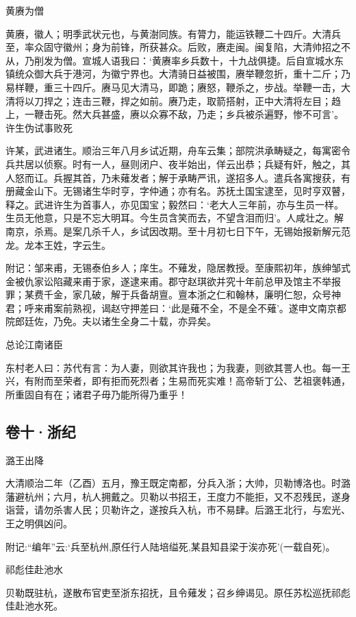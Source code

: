 \documentclass[]{article}
\begin{document}
黄赓为僧

黄赓，徽人；明季武状元也，与黄澍同族。有膂力，能运铁鞭二十四斤。大清兵至，率众固守徽州；身为前锋，所获甚众。后败，赓走闽。闽复陷，大清帅招之不从，乃削发为僧。宣城人语我曰：`黄赓率乡兵数十，十九战俱捷。后自宣城水东镇统众御大兵于港河，为徽宁界也。大清骑日益被围，赓举鞭忽折，重十二斤；乃易样鞭，重三十四斤。赓马见大清马，即跪；赓怒，鞭杀之，步战。举鞭一击，大清将以刀捍之；连击三鞭，捍之如前。赓乃走，取箭搭射，正中大清将左目；趋上，一鞭击死。然大兵甚盛，赓以众寡不敌，乃走；乡兵被杀遍野，惨不可言'。
许生伪试事败死

许某，武进诸生。顺治三年八月乡试近期，舟车云集；部院洪承畴疑之，每寓密令兵共居以侦察。时有一人，昼则闭户、夜半始出，佯云出恭；兵疑有奸，触之，其人怒而讧。兵握其首，乃未薙发者；解于承畴严讯，遂招多人。遣兵各寓搜获，有册藏金山下。无锡诸生华时亨，字仲通；亦有名。苏抚土国宝逮至，见时亨双瞽，释之。武进许生为首事人，亦见国宝；毅然曰：`老大人三年前，亦与生员一样。生员无他意，只是不忘大明耳。今生员含笑而去，不望含泪而归'。人咸壮之。解南京，杀焉。是案几杀千人，乡试因改期。至十月初七日下午，无锡始报新解元范龙。龙本王姓，字云生。

附记：邹来甫，无锡泰伯乡人；庠生。不薙发，隐居教授。至康熙初年，族绅邹式金被仇家讼陷藏来甫于家，遂逮来甫。郡守赵琪欲并究十年前总甲及馆主不举报罪；某费千金，家几破，解于兵备胡亶。亶本浙之仁和翰林，廉明仁恕，众号神君；呼来甫案前熟视，谒赵守押差曰：`此是薙不全，不是全不薙'。遂申文南京都院郎廷佐，乃免。夫以诸生全身二十载，亦异矣。

总论江南诸臣

东村老人曰：苏代有言：为人妻，则欲其许我也；为我妻，则欲其詈人也。每一王兴，有附而至荣者，即有拒而死烈者；生易而死实难！高帝斩丁公、艺祖褒韩通，所重固自有在；诸君子毋乃能所得乃重乎！

\hypertarget{header-n62}{%
\subsection{卷十·浙纪}\label{header-n62}}

潞王出降

大清顺治二年（乙酉）五月，豫王既定南都，分兵入浙；大帅，贝勒博洛也。时潞藩避杭州；六月，杭人拥戴之。贝勒以书招王，王度力不能拒，又不忍残民，遂身诣营，请勿杀害人民；贝勒许之，遂按兵入杭，市不易肆。后潞王北行，与宏光、王之明俱凶问。

附记:``编年''云:`兵至杭州,原任行人陆培缢死,某县知县梁于涘亦死'(一载自死)。

祁彪佳赴池水

贝勒既驻杭，遂散布官吏至浙东招抚，且令薙发；召乡绅谒见。原任苏松巡抚祁彪佳赴池水死。
\end{document}
